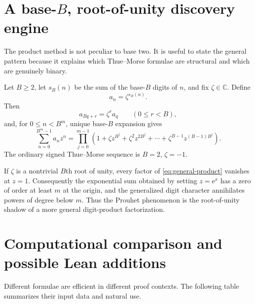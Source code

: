 \documentclass[11pt,oneside]{article}
\theoremstyle{definition}
\theoremstyle{remark}
\newcommand{\C}{\mathbb C}
\newcommand{\e}{\mathrm e}
\begin{document}
\section{A base-\texorpdfstring{\(B\)}{B}, root-of-unity discovery engine}
\label{sec:generalization}

The product method is not peculiar to base two.  It is useful to state the
general pattern because it explains which Thue--Morse formulae are structural
and which are genuinely binary.

Let \(B\ge2\), let \(s_B(n)\) be the sum of the base-\(B\) digits of \(n\),
and fix \(\zeta\in\C\).  Define
\begin{equation}
 a_n=\zeta^{s_B(n)}.
 \label{eq:general-digit-character}
\end{equation}
Then
\begin{equation}
 a_{Bq+r}=\zeta^r a_q
 \qquad(0\le r<B),
 \label{eq:general-recurrence}
\end{equation}
and, for \(0\le n<B^m\), unique base-\(B\) expansion gives
\begin{equation}
 \sum_{n=0}^{B^m-1}a_nz^n
 =\prod_{j=0}^{m-1}
   \left(1+\zeta z^{B^j}+\zeta^2z^{2B^j}
      +\cdots+\zeta^{B-1}z^{(B-1)B^j}\right).
 \label{eq:general-product}
\end{equation}
The ordinary signed Thue--Morse sequence is \(B=2\), \(\zeta=-1\).

If \(\zeta\) is a nontrivial \(B\)th root of unity, every factor of
\eqref{eq:general-product} vanishes at \(z=1\).  Consequently the exponential
sum obtained by setting \(z=\e^x\) has a zero of order at least \(m\) at the
origin, and the generalized digit character annihilates powers of degree
below \(m\).  Thus the Prouhet phenomenon is the root-of-unity shadow of a
more general digit-product factorization.

\section{Computational comparison and possible Lean additions}
\label{sec:formalization}

Different formulae are efficient in different proof contexts.  The following
table summarizes their input data and natural use.
\end{document}
